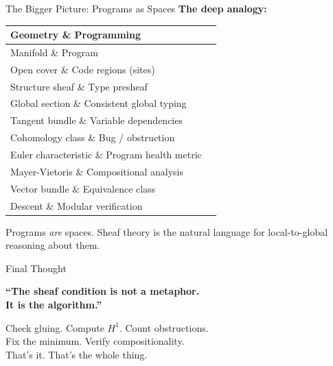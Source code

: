\documentclass[aspectratio=169,10pt]{beamer}
\begin{document}
\begin{frame}{The Bigger Picture: Programs as Spaces}
\textbf{The deep analogy:}

\vspace{0.3em}
\begin{center}
\renewcommand{\arraystretch}{1.4}
\begin{tabular}{@{}ll@{}}
\toprule
\textbf{Geometry} \& \textbf{Programming} \\
\midrule
Manifold \& Program \\
Open cover \& Code regions (sites) \\
Structure sheaf \& Type presheaf \\
Global section \& Consistent global typing \\
Tangent bundle \& Variable dependencies \\
Cohomology class \& Bug / obstruction \\
Euler characteristic \& Program health metric \\
Mayer-Vietoris \& Compositional analysis \\
Vector bundle \& Equivalence class \\
Descent \& Modular verification \\
\bottomrule
\end{tabular}
\end{center}

Programs \emph{are} spaces. Sheaf theory is the natural language for local-to-global reasoning about them.
\end{frame}

\begin{frame}{Final Thought}
\begin{center}
\vspace{1.5cm}
{\Large\textbf{``The sheaf condition is not a metaphor.\\It is the algorithm.''}}

\vspace{1.5cm}
{\normalsize Check gluing. Compute $H^1$. Count obstructions.\\Fix the minimum. Verify compositionality.\\That's it. That's the whole thing.}
\end{center}
\end{frame}
\end{document}
